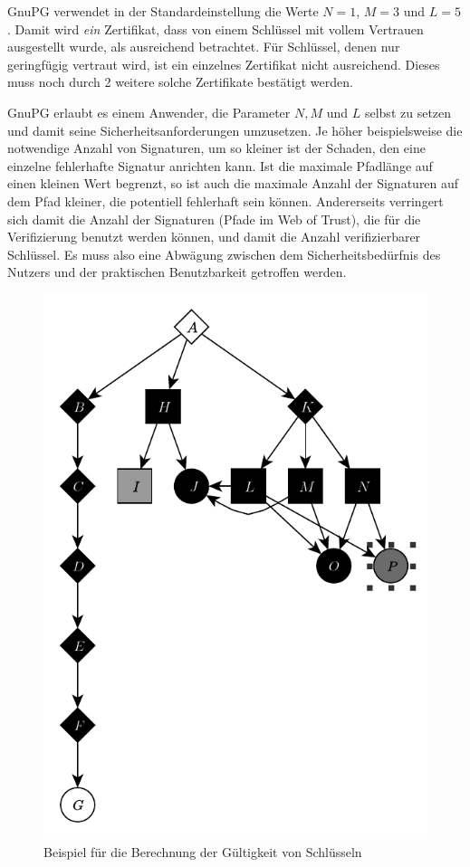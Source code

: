 GnuPG verwendet in der Standardeinstellung die Werte $N=1$, $M=3$ und
$L=5$. Damit wird \emph{ein} Zertifikat, dass von einem Schl\"ussel
mit vollem Vertrauen ausgestellt wurde, als ausreichend
betrachtet. F\"ur Schl\"ussel, denen nur geringf\"ugig vertraut wird,
ist ein einzelnes Zertifikat nicht ausreichend. Dieses muss noch durch
2 weitere solche Zertifikate best\"atigt werden. 

GnuPG erlaubt es einem Anwender, die Parameter $N, M$ und $L$ selbst
zu setzen und damit seine Sicherheitsanforderungen umzusetzen. Je
höher beispielsweise die notwendige Anzahl von Signaturen, um so
kleiner ist der Schaden, den eine einzelne fehlerhafte Signatur
anrichten kann. Ist die maximale Pfadlänge auf einen kleinen Wert
begrenzt, so ist auch die maximale Anzahl der Signaturen auf dem Pfad
kleiner, die potentiell fehlerhaft sein können. Andererseits
verringert sich damit die Anzahl der Signaturen (Pfade im Web of
Trust), die für die Verifizierung benutzt werden können, und damit die
Anzahl verifizierbarer Schlüssel. Es muss also eine Abwägung zwischen
dem Sicherheitsbedürfnis des Nutzers und der praktischen Benutzbarkeit
getroffen werden.

\begin{figure}[t]
  \centering
  \includegraphics[scale=1.0]{images/trust-beispiel.pdf}
  \caption{Beispiel für die Berechnung der Gültigkeit von Schlüsseln}
  \label{fig:trust-beispiel}
\end{figure}

